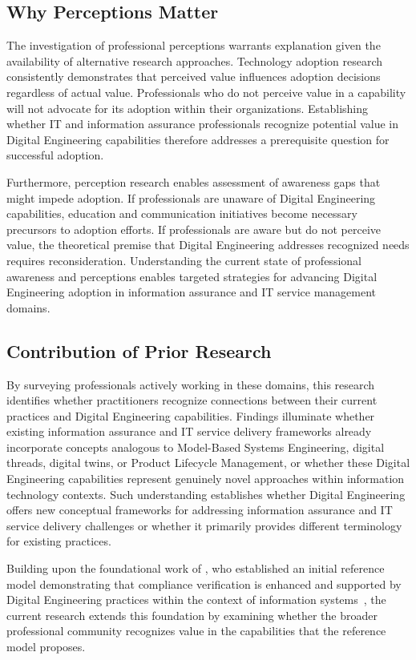 \subsection{Why Perceptions Matter}

The investigation of professional perceptions warrants explanation given the availability of alternative research approaches. Technology adoption research consistently demonstrates that perceived value influences adoption decisions regardless of actual value. Professionals who do not perceive value in a capability will not advocate for its adoption within their organizations. Establishing whether IT and information assurance professionals recognize potential value in Digital Engineering capabilities therefore addresses a prerequisite question for successful adoption.

Furthermore, perception research enables assessment of awareness gaps that might impede adoption. If professionals are unaware of Digital Engineering capabilities, education and communication initiatives become necessary precursors to adoption efforts. If professionals are aware but do not perceive value, the theoretical premise that Digital Engineering addresses recognized needs requires reconsideration. Understanding the current state of professional awareness and perceptions enables targeted strategies for advancing Digital Engineering adoption in information assurance and IT service management domains.

\subsection{Contribution of Prior Research}

By surveying professionals actively working in these domains, this research identifies whether practitioners recognize connections between their current practices and Digital Engineering capabilities. Findings illuminate whether existing information assurance and IT service delivery frameworks already incorporate concepts analogous to Model-Based Systems Engineering, digital threads, digital twins, or Product Lifecycle Management, or whether these Digital Engineering capabilities represent genuinely novel approaches within information technology contexts. Such understanding establishes whether Digital Engineering offers new conceptual frameworks for addressing information assurance and IT service delivery challenges or whether it primarily provides different terminology for existing practices.

Building upon the foundational work of \citeauthor{Bonar_Hastings_2024}, who established an initial reference model demonstrating that compliance verification is enhanced and supported by Digital Engineering practices within the context of information systems~\parencite{Bonar_Hastings_2024}, the current research extends this foundation by examining whether the broader professional community recognizes value in the capabilities that the reference model proposes.

